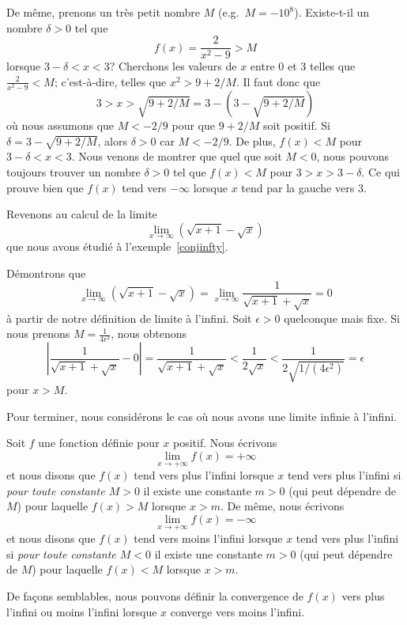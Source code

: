 {\begin{egg}
De même, prenons un très petit nombre $M$ (e.g.\ $M=-10^8$).
Existe-t-il un nombre $\delta>0$ tel que
\[
f(x)=\frac{2}{x^2-9} > M
\]
lorsque $3-\delta <x <3$?  Cherchons les valeurs de $x$ entre $0$ et
$3$ telles que $\displaystyle \frac{2}{x^2-9} < M$; c'est-à-dire,
telles que $x^2 > 9 + 2/M$.  Il faut donc que
\[
3> x > \sqrt{9+2/M} = 3 - (3 - \sqrt{9+2/M})
\]
où nous assumons que $M<-2/9$ pour que $9+2/M$ soit positif.
Si $\delta = 3 - \sqrt{9+2/M}$, alors $\delta > 0$ car $M < -2/9$.
De plus, $f(x)<M$ pour $3-\delta<x<3$.  Nous venons de montrer que
quel que soit $M<0$, nous pouvons toujours trouver un nombre
$\delta>0$ tel que $f(x)<M$ pour $3>x>3-\delta$.  Ce qui prouve bien
que $f(x)$ tend vers $-\infty$ lorsque $x$ tend par la gauche vers $3$. 
\end{egg}

\begin{egg}
Revenons au calcul de la limite
\[
\lim_{x\rightarrow \infty} \left(\sqrt{x+1}-\sqrt{x}\right)
\]
que nous avons étudié à l'exemple~\ref{conjinfty}.

Démontrons que
\[
\lim_{x\rightarrow \infty} \left(\sqrt{x+1}-\sqrt{x}\right)
= \lim_{x\rightarrow \infty} \frac{1}{\sqrt{x+1}+\sqrt{x}} = 0
\]
à partir de notre définition de limite à l'infini.  Soit
$\epsilon > 0$ quelconque mais fixe.  Si nous prenons 
$\displaystyle M = \frac{1}{4\epsilon^2}$, nous obtenons
\[
\left| \frac{1}{\sqrt{x+1}+\sqrt{x}} - 0 \right|
= \frac{1}{\sqrt{x+1}+\sqrt{x}} < \frac{1}{2\sqrt{x}}
< \frac{1}{2\sqrt{1/(4\epsilon^2)}} = \epsilon
\]
pour $x>M$.
\end{egg}

Pour terminer, nous considérons le cas où nous avons une limite infinie à
l'infini.

\begin{defn} 
Soit $f$ une fonction définie pour $x$ positif.  Nous écrivons
\[
\lim_{x\rightarrow +\infty} f(x) = +\infty
\]
et nous disons que $f(x)$ tend vers plus l'infini lorsque $x$ tend vers
plus l'infini si {\em pour toute constante $M>0$} il existe une constante
$m>0$ (qui peut dépendre de $M$) pour laquelle $f(x) > M$ lorsque $x>m$.  De
même, nous écrivons
\[
\lim_{x\rightarrow +\infty} f(x) = -\infty
\]
et nous disons que $f(x)$ tend vers moins l'infini lorsque $x$ tend vers
plus l'infini si {\em pour toute constante $M<0$} il existe une constante
$m>0$ (qui peut dépendre de $M$) pour laquelle $f(x) < M$ lorsque $x>m$.

De façons semblables, nous pouvons définir la convergence de $f(x)$ vers plus
l'infini ou moins l'infini lorsque $x$ converge vers moins l'infini.
\end{defn}

}
